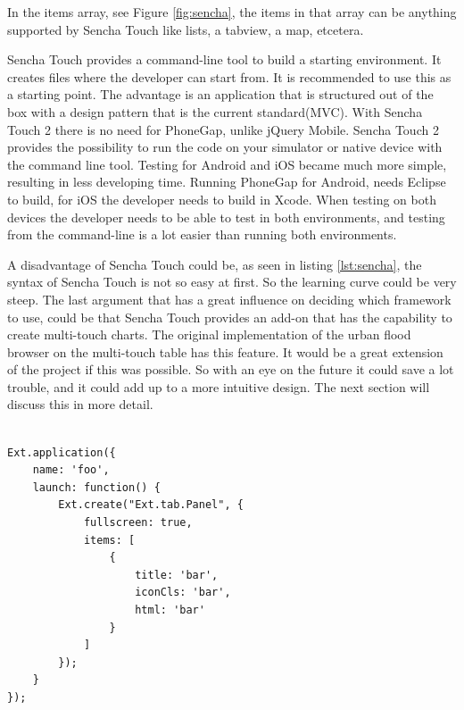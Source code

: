 \begin{description}
In the items array, see Figure \ref{fig:sencha}, the items in that array can be anything supported by Sencha Touch like lists, a tabview, a map, etcetera. 

Sencha Touch provides a command-line tool to build a starting environment. It creates files where the developer can start from. It is recommended to use this as a starting point. The advantage is an application that is structured out of the box with a design pattern that is the current standard(MVC). With Sencha Touch 2 there is no need for PhoneGap, unlike jQuery Mobile. Sencha Touch 2 provides the possibility to run the code on your simulator or native device with the command line tool. Testing for Android and iOS became much more simple, resulting in less developing time. Running PhoneGap for Android, needs Eclipse\cite{eclipse} to build, for iOS the developer needs to build in Xcode\cite{xcode}. When testing on both devices the developer needs to be able to test in both environments, and testing from the command-line is a lot easier than running both environments. 
 
A disadvantage of Sencha Touch could be, as seen in listing \ref{lst:sencha}, the syntax of Sencha Touch is not so easy at first. So the learning curve could be very steep.
The last argument that has a great influence on deciding which framework to use, could be that Sencha Touch provides an add-on that has the capability to create multi-touch charts. The original implementation of the urban flood browser on the multi-touch table has this feature. It would be a great extension of the project if this was possible. So with an eye on the future it could save a lot trouble, and it could add up to a more intuitive design. The next section will discuss this in more detail.

\vspace{1cm}
\begin{lstlisting}[caption=Sencha Touch application example. This example creates an application with the name 'foo'.  The html can be placed inside the items array, label={lst:sencha}]

Ext.application({
    name: 'foo',
    launch: function() {
        Ext.create("Ext.tab.Panel", {
            fullscreen: true,
            items: [
                {
                    title: 'bar',
                    iconCls: 'bar',
                    html: 'bar'
                }
            ]
        });
    }
});
\end{lstlisting}
\end{description}

